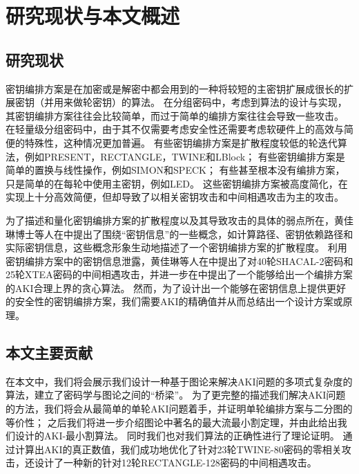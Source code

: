 
\chapter{研究现状与本文概述}
\label{chap:Intro}
\section{研究现状}
密钥编排方案是在加密或是解密中都会用到的一种将较短的主密钥扩展成很长的扩展密钥（并用来做轮密钥）的算法。
在分组密码中，考虑到算法的设计与实现，其密钥编排方案往往会比较简单，而过于简单的编排方案往往会导致一些攻击。
在轻量级分组密码中，由于其不仅需要考虑安全性还需要考虑软硬件上的高效与简便的特殊性，这种情况更加普遍。
有些密钥编排方案是扩散程度较低的轮迭代算法，例如PRESENT，RECTANGLE，TWINE和LBlock；
有些密钥编排方案是简单的置换与线性操作，例如SIMON和SPECK；
有些甚至根本没有编排方案，只是简单的在每轮中使用主密钥，例如LED。
这些密钥编排方案被高度简化，在实现上十分高效简便，但却导致了以相关密钥攻击和中间相遇攻击为主的攻击。

为了描述和量化密钥编排方案的扩散程度以及其导致攻击的具体的弱点所在，黄佳琳博士等人在中提出了围绕“密钥信息”的一些概念，如计算路径、密钥依赖路径和实际密钥信息，这些概念形象生动地描述了一个密钥编排方案的扩散程度。
利用密钥编排方案中的密钥信息泄露，黄佳琳等人在中提出了对40轮SHACAL-2密码和25轮XTEA密码的中间相遇攻击，并进一步在中提出了一个能够给出一个编排方案的AKI合理上界的贪心算法。
然而，为了设计出一个能够在密钥信息上提供更好的安全性的密钥编排方案，我们需要AKI的精确值并从而总结出一个设计方案或原理。

\section{本文主要贡献}
在本文中，我们将会展示我们设计一种基于图论来解决AKI问题的多项式复杂度的算法，建立了密码学与图论之间的“桥梁”。
为了更完整的描述我们解决AKI问题的方法，我们将会从最简单的单轮AKI问题着手，并证明单轮编排方案与二分图的等价性；
之后我们将进一步介绍图论中著名的最大流最小割定理，并由此给出我们设计的AKI-最小割算法。
同时我们也对我们算法的正确性进行了理论证明。
通过计算出AKI的真正数值，我们成功地优化了针对23轮TWINE-80密码的零相关攻击，还设计了一种新的针对12轮RECTANGLE-128密码的中间相遇攻击。

